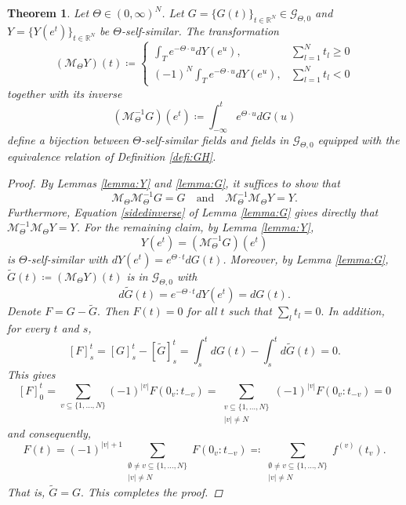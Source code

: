 \documentclass[english, a4paper, 12pt,reqno]{amsart}
\newtheorem{theorem}[defi]{Theorem}
\begin{document}
\begin{theorem}
\label{theorem:bijection}
Let $\Theta\in (0,\infty)^N$. Let $G=\{G(t)\}_{t\in\mathbb{R}^N}\in\mathcal{G}_{\Theta,0}$ and $Y=\{Y(e^t)\}_{t\in\mathbb{R}^N}$ be $\Theta$-self-similar. The transformation
 $$(\mathcal{M}_\Theta Y)(t) \coloneqq \begin{cases} 
      \int_T e^{-\Theta\cdot u} dY(e^u), & \sum_{l=1}^N t_l \geq 0 \\
      (-1)^N\int_T e^{-\Theta\cdot u} dY(e^u), & \sum_{l=1}^N t_l < 0 
   \end{cases}$$
together with its inverse
$$(\mathcal{M}_\Theta^{-1} G)(e^t) \coloneqq \int_{-\infty}^{t}e^{\Theta\cdot u} dG(u)$$
define a bijection between $\Theta$-self-similar fields and fields in $\mathcal{G}_{\Theta,0}$ equipped with the equivalence relation of Definition \ref{defi:GH}.
\begin{proof}
By Lemmas \ref{lemma:Y} and \ref{lemma:G}, it suffices to show that 
$$\mathcal{M}_\Theta \mathcal{M}^{-1}_\Theta G = G \quad\text{and}\quad \mathcal{M}^{-1}_\Theta \mathcal{M}_\Theta  Y = Y.$$ 
Furthermore, Equation \eqref{sidedinverse} of Lemma \ref{lemma:G} gives directly that $\mathcal{M}^{-1}_\Theta \mathcal{M}_\Theta  Y = Y$.
For the remaining claim, by Lemma \ref{lemma:Y}, 
$$Y(e^t) = (\mathcal{M}_\Theta^{-1} G)(e^t)$$
is $\Theta$-self-similar with $dY(e^t) = e^{\Theta\cdot t} dG(t)$. Moreover, by Lemma \ref{lemma:G}, $\tilde{G}(t) \coloneqq (\mathcal{M}_\Theta Y)(t)$ is in $\mathcal{G}_{\Theta,0}$ with 
$$d\tilde{G}(t) = e^{-\Theta \cdot t} dY(e^t) = dG(t).$$
Denote $F  = G-\tilde{G}.$ Then $F(t) = 0$ for all $t$ such that $\sum_l t_l = 0.$ In addition, for every $t$ and $s$,
$$\left[F\right]_s^t = \left[G\right]_s^t - [\tilde{G}]_s^t = \int_s^t dG(t) - \int_s^t d\tilde{G}(t) = 0.$$
This gives
$$[F]_0^t = \sum_{v\subseteq \{1,\dots,N\}} (-1)^{|v|} F(0_v:t_{-v}) = \sum_{\substack{v\subseteq \{1,\dots,N\}\\
|v| \neq N}} (-1)^{|v|} F(0_v:t_{-v})= 0$$
and consequently,
$$F(t) = (-1)^{|v|+1} \sum_{\substack{\emptyset \neq v\subseteq \{1,\dots,N\}\\
|v| \neq N}} F(0_v:t_{-v}) \eqqcolon \sum_{\substack{\emptyset \neq v\subseteq \{1,\dots,N\}\\
|v| \neq N}} f^{(v)}(t_v).$$
That is, $\tilde{G} = G.$ This completes the proof.
\end{proof}
\end{theorem}
\end{document}
